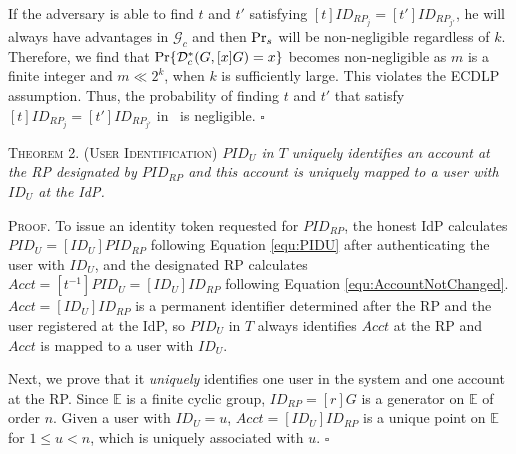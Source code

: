 \newc
If the adversary is able to find $t$ and $t'$ satisfying $[t]ID_{RP_j} = [t']ID_{RP_{j'}}$,
    he will always have advantages in $\mathcal{G}_c$ and then
    ${\rm Pr}_s$ will be non-negligible regardless of $k$.
Therefore, we find that
${\rm Pr}\{\mathcal{D}^*_c(G, [x]G)=x\}$ becomes non-negligible as $m$ is a finite integer and $m \ll 2^k$, when $k$ is sufficiently large.
\oldc
This violates the ECDLP assumption. Thus, the probability of finding $t$ and $t'$ that satisfy $[t]ID_{RP_j} = [t']ID_{RP_{j'}}$ in \usso~is negligible. \hfill $\square$


\newc
\vspace{1mm}
\noindent\textsc{Theorem 2. (User Identification)} {\em $PID_U$ in $T$ uniquely identifies an account at the RP designated by $PID_{RP}$ and this account is uniquely mapped to a user with $ID_U$ at the IdP.}


\vspace{0.75mm}
\noindent\textsc{Proof.}
To issue an identity token requested for $PID_{RP}$,
    the honest IdP calculates $PID_U = [ID_U]PID_{RP}$ following Equation \ref{equ:PIDU} after authenticating the user with $ID_U$,
and the designated RP calculates $Acct = [t^{-1}]PID_{U} = [ID_U]ID_{RP}$ following Equation \ref{equ:AccountNotChanged}.
$Acct = [ID_U]ID_{RP}$ is a permanent identifier determined after the RP and the user registered at the IdP,
so $PID_U$ in $T$ always identifies $Acct$ at the RP and $Acct$ is mapped to a user with $ID_U$.

Next, we prove that it \emph{uniquely} identifies one user in the system and one account at the RP.
Since $\mathbb{E}$ is a finite cyclic group, $ID_{RP} = [r]G$ is a generator on $\mathbb{E}$ of order $n$. Given a user with $ID_U = u$, $Acct = [ID_U]ID_{RP}$ is a unique point on $\mathbb{E}$ for $1 \leq u < n$, which is uniquely associated with $u$. \hfill $\square$


